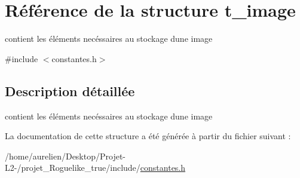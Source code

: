 \hypertarget{structt__image}{}\section{Référence de la structure t\+\_\+image}
\label{structt__image}


contient les éléments necéssaires au stockage d\textquotesingle{}une image  




{\ttfamily \#include $<$constantes.\+h$>$}



\subsection{Description détaillée}
contient les éléments necéssaires au stockage d\textquotesingle{}une image 

La documentation de cette structure a été générée à partir du fichier suivant \+:\begin{DoxyCompactItemize}
\item 
/home/aurelien/\+Desktop/\+Projet-\/\+L2-\//projet\+\_\+\+Roguelike\+\_\+true/include/\hyperlink{constantes_8h}{constantes.\+h}\end{DoxyCompactItemize}
